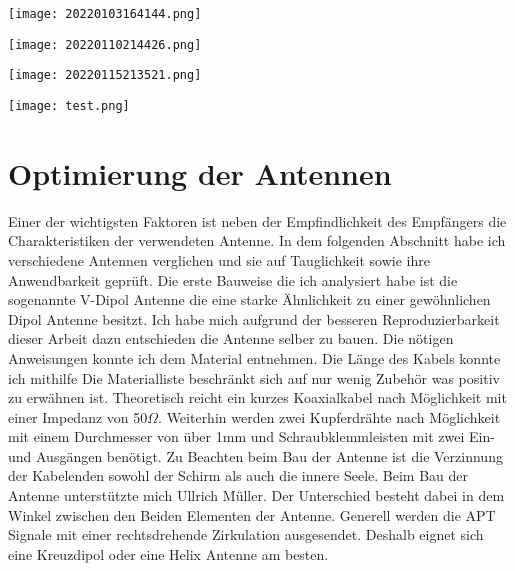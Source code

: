\begin{center}
    \centering
    \texttt{[image: 20220103164144.png]}
\end{center} 
\begin{center}
    \centering
    \texttt{[image: 20220110214426.png]}
\end{center}

\begin{center}
    \centering
    \texttt{[image: 20220115213521.png]}
\end{center}

\begin{center}
    \centering
    \texttt{[image: test.png]}
\end{center}

\section[]{Optimierung der Antennen}

\begin{multicols*}{2}
    Einer der wichtigsten Faktoren ist neben der Empfindlichkeit des Empfängers die Charakteristiken der verwendeten Antenne. In dem folgenden Abschnitt habe ich verschiedene Antennen verglichen und sie auf Tauglichkeit sowie ihre Anwendbarkeit geprüft. Die erste Bauweise die ich analysiert habe ist die sogenannte V-Dipol Antenne die eine starke Ähnlichkeit zu einer gewöhnlichen Dipol Antenne besitzt. Ich habe mich aufgrund der besseren Reproduzierbarkeit dieser Arbeit dazu entschieden die Antenne selber zu bauen. Die nötigen Anweisungen konnte ich dem Material \cite[]{Diy137MHz} entnehmen. Die Länge des Kabels konnte ich mithilfe Die Materialliste beschränkt sich auf nur wenig Zubehör was positiv zu erwähnen ist. Theoretisch reicht ein kurzes Koaxialkabel nach Möglichkeit mit einer Impedanz von 50\( \Omega \). Weiterhin werden zwei Kupferdrähte nach Möglichkeit mit einem Durchmesser von über 1mm und Schraubklemmleisten mit zwei Ein- und Ausgängen benötigt. Zu Beachten beim Bau der Antenne ist die Verzinnung der Kabelenden sowohl der Schirm als auch die innere Seele. Beim Bau der Antenne unterstützte mich Ullrich Müller. Der Unterschied besteht dabei in dem Winkel zwischen den Beiden Elementen der Antenne. Generell werden die APT Signale mit einer rechtsdrehende Zirkulation ausgesendet. Deshalb eignet sich eine Kreuzdipol oder eine Helix Antenne am besten.
    
\end{multicols*}

 